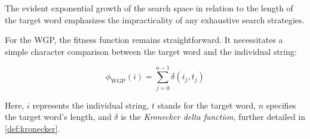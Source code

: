   The evident exponential growth of the search space in relation to the length 
  of the target word emphasizes the impracticality of any exhaustive search 
  strategies.

  For the WGP, the fitness function remains straightforward.
  It necessitates a simple character comparison between the target word and the 
  individual string:

  \begin{equation}
  \label{eq:keen:operators:word_guessing:fitness}
    \phi_\mathrm{WGP}(i) = \sum_{j=0}^{n-1} \delta(i_j, t_j)
  \end{equation}

  Here, \(i\) represents the individual string, \(t\) stands for the target 
  word, \(n\) specifies the target word's length, and \(\delta\) is the 
  \textit{Kronecker delta function}, further detailed in \vref{def:kronecker}.
